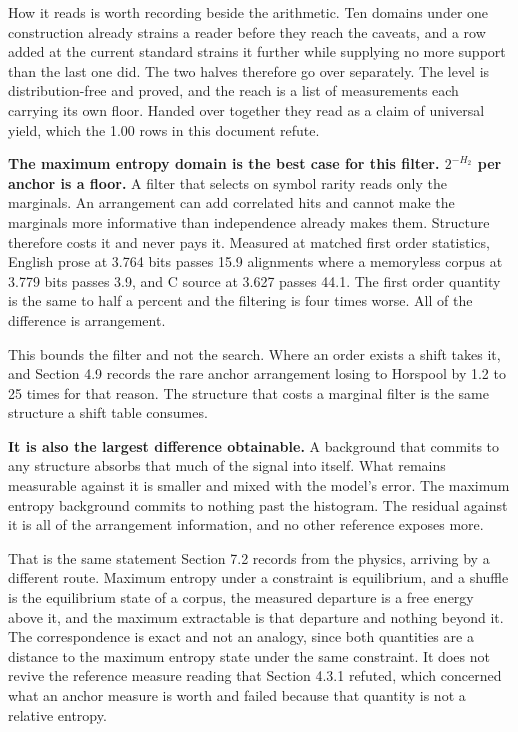How it reads is worth recording beside the arithmetic. Ten domains under one construction already strains a reader before they reach the caveats, and a row added at the current standard strains it further while supplying no more support than the last one did. The two halves therefore go over separately. The level is distribution-free and proved, and the reach is a list of measurements each carrying its own floor. Handed over together they read as a claim of universal yield, which the 1.00 rows in this document refute.

\textbf{The maximum entropy domain is the best case for this filter. \(2^{-H_2}\) per anchor is a floor.} A filter that selects on symbol rarity reads only the marginals. An arrangement can add correlated hits and cannot make the marginals more informative than independence already makes them. Structure therefore costs it and never pays it. Measured at matched first order statistics, English prose at 3.764 bits passes 15.9 alignments where a memoryless corpus at 3.779 bits passes 3.9, and C source at 3.627 passes 44.1. The first order quantity is the same to half a percent and the filtering is four times worse. All of the difference is arrangement.

This bounds the filter and not the search. Where an order exists a shift takes it, and Section 4.9 records the rare anchor arrangement losing to Horspool by 1.2 to 25 times for that reason. The structure that costs a marginal filter is the same structure a shift table consumes.

\textbf{It is also the largest difference obtainable.} A background that commits to any structure absorbs that much of the signal into itself. What remains measurable against it is smaller and mixed with the model's error. The maximum entropy background commits to nothing past the histogram. The residual against it is all of the arrangement information, and no other reference exposes more.

That is the same statement Section 7.2 records from the physics, arriving by a different route. Maximum entropy under a constraint is equilibrium, and a shuffle is the equilibrium state of a corpus, the measured departure is a free energy above it, and the maximum extractable is that departure and nothing beyond it. The correspondence is exact and not an analogy, since both quantities are a distance to the maximum entropy state under the same constraint. It does not revive the reference measure reading that Section 4.3.1 refuted, which concerned what an anchor measure is worth and failed because that quantity is not a relative entropy.


